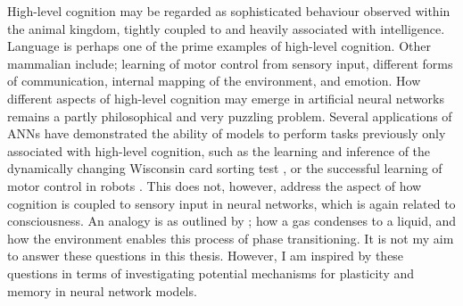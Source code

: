 High-level cognition may be regarded as sophisticated behaviour observed within the animal kingdom, tightly coupled to and heavily associated with intelligence. Language is perhaps one of the prime examples of high-level cognition. Other mammalian include; learning of motor control from sensory input, different forms of communication, internal mapping of the environment, and emotion.
How different aspects of high-level cognition may emerge in artificial neural networks remains a partly philosophical and very puzzling problem. Several applications of ANNs have demonstrated the ability of models to perform tasks previously only associated with high-level cognition, such as the learning and inference of the dynamically changing Wisconsin card sorting test \citep{Maniadakis2012}, or the successful learning of motor control in robots \citep{Sugita2005, Yamashita2008, Tani2014}. 
This does not, however, address the aspect of how cognition is coupled to sensory input in neural networks, which is again related to consciousness. An analogy is as outlined by \cite{Freeman2003}; how a gas condenses to a liquid, and how the environment enables this process of phase transitioning.
It is not my aim to answer these questions in this thesis. However, I am inspired by these questions in terms of investigating potential mechanisms for plasticity and memory in neural network models.
\\

